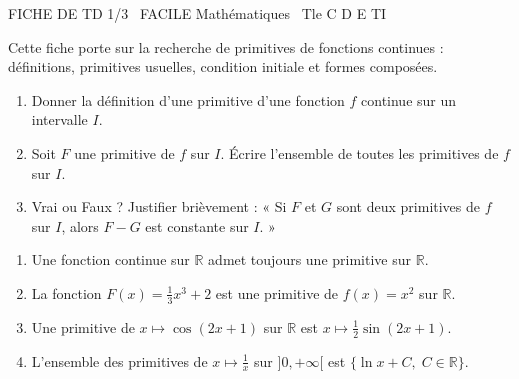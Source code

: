 \documentclass[11pt]{article}
\begin{document}
\begin{tcolorbox}[enhanced,colback=popink,colframe=popink,arc=10pt,boxrule=0pt,left=12pt,right=12pt,top=9pt,bottom=9pt]
{\color{white}\popxbold\small FICHE DE TD 1/3 \textbullet\ FACILE \hfill Mathématiques \textbullet\ Tle C D E TI\par}
\end{tcolorbox}
\vspace{4pt}
Cette fiche porte sur la recherche de primitives de fonctions continues : définitions, primitives usuelles, condition initiale et formes composées.

\begin{exercice}
\begin{enumerate}
    \item Donner la définition d'une primitive d'une fonction $f$ continue sur un intervalle $I$.
    \item Soit $F$ une primitive de $f$ sur $I$. Écrire l'ensemble de toutes les primitives de $f$ sur $I$.
    \item Vrai ou Faux ? Justifier brièvement : « Si $F$ et $G$ sont deux primitives de $f$ sur $I$, alors $F-G$ est constante sur $I$. »
\end{enumerate}
\end{exercice}

\begin{exercice}
\begin{enumerate}
    \item Une fonction continue sur $\mathbb{R}$ admet toujours une primitive sur $\mathbb{R}$.
    \item La fonction $F(x) = \frac{1}{3}x^3 + 2$ est une primitive de $f(x)=x^2$ sur $\mathbb{R}$.
    \item Une primitive de $x \mapsto \cos(2x+1)$ sur $\mathbb{R}$ est $x \mapsto \frac{1}{2}\sin(2x+1)$.
    \item L'ensemble des primitives de $x \mapsto \frac{1}{x}$ sur $]0, +\infty[$ est $\{ \ln x + C,\; C \in \mathbb{R} \}$.
\end{enumerate}
\end{exercice}
\end{document}
